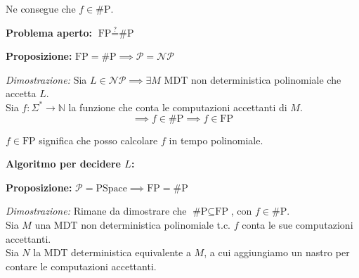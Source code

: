 Ne consegue che $f \in \text{\#P}$. 

\vspace{0.4cm}
\textbf{Problema aperto:} $\text{FP} \stackrel{?}{=} \text{\#P}$

\vspace{0.4cm}
\textbf{Proposizione:} $\text{FP} = \text{\#P} \implies \mathcal{P} = \mathcal{NP}$

\textit{Dimostrazione:} Sia $L \in \mathcal{NP} \implies \exists M$ MDT non deterministica polinomiale che accetta $L$. \\
Sia $f: \Sigma^* \to \mathbb{N}$ la funzione che conta le computazioni accettanti di $M$.
$$ \implies f \in \text{\#P} \implies f \in \text{FP} $$

$f \in \text{FP}$ significa che posso calcolare $f$ in tempo polinomiale.

\textbf{Algoritmo per decidere $L$:}
\begin{center}
\end{center}

\vspace{0.4cm}
\textbf{Proposizione:} $\mathcal{P} = \text{PSpace} \implies \text{FP} = \text{\#P}$

\textit{Dimostrazione:} Rimane da dimostrare che $\text{\#P} \subseteq \text{FP}$, con $f \in \text{\#P}$. \\
Sia $M$ una MDT non deterministica polinomiale t.c. $f$ conta le sue computazioni accettanti. \\
Sia $N$ la MDT deterministica equivalente a $M$, a cui aggiungiamo un nastro per contare le computazioni accettanti.

\begin{flushright}
\end{flushright}

